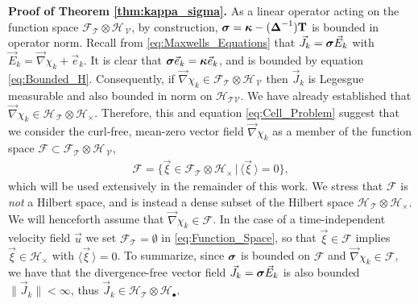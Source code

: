 \documentclass[11pt]{amsart}
\newcommand{\Tb}{\mathbf{T}}
\newcommand{\Tc}{\mathcal{T}}
\newcommand{\Vc}{\mathcal{V}}
\newcommand{\Hs}{\mathscr{H}}
\newcommand{\Fs}{\mathscr{F}}
\newcommand\bsig{\mbox{\boldmath${\sigma}$}}
\newcommand\bDelta{\mbox{\boldmath${\Delta}$}}
\newcommand\bkappa{\mbox{\boldmath${\kappa}$}}
\begin{document}
\textbf{Proof of Theorem \ref{thm:kappa_sigma}.}\hspace{1ex}
%
As a linear operator acting on the function space
$\Fs_{\Tc}\otimes\Hs_{\,\Vc}$, by construction,
$\bsig=\bkappa-(\bDelta^{-1})\Tb$ is bounded in operator norm. Recall
from \eqref{eq:Maxwells_Equations} that $\vec{J}_k=\bsig\vec{E}_k$
with $\vec{E}_k=\vec{\nabla}\chi_k+\vec{e}_k$. It is clear that
$\bsig\vec{e}_k=\bkappa\vec{e}_k$, and is bounded by equation
\eqref{eq:Bounded_H}. Consequently, if
$\vec{\nabla}\chi_k\in\Fs_{\Tc}\otimes\Hs_{\,\Vc}$ then  
$\vec{J}_k$ is Legesgue measurable and also bounded in norm on 
$\Hs_{\Tc\Vc}$. We have already established that 
$\vec{\nabla}\chi_k\in\Hs_{\,\Tc}\otimes\Hs_\times$. Therefore, this and equation
\eqref{eq:Cell_Problem} suggest that we consider the curl-free,
mean-zero vector field $\vec{\nabla}\chi_k$ as a member of the function space
$\Fs\subset\Fs_{\Tc}\otimes\Hs_{\,\Vc}$,         
%
\begin{align}\label{eq:Function_Space}
  \Fs=\{\vec{\xi}\in\Fs_{\Tc}\otimes\Hs_\times \,|\, \langle\vec{\xi}\,\rangle=0\},  
\end{align}
%
which will be used extensively in the remainder of this work. We
stress that $\Fs$ is \emph{not} a Hilbert space, and is instead a
dense subset of the Hilbert space $\Hs_{\,\Tc}\otimes\Hs_\times$. We will
henceforth assume that $\vec{\nabla}\chi_k\in\Fs$. In the case of a
time-independent velocity field $\vec{u}$ we set $\Fs_{\Tc}=\emptyset$ in 
\eqref{eq:Function_Space}, so that $\vec{\xi}\in\Fs$ implies 
$\vec{\xi}\in\Hs_\times$ with $\langle\vec{\xi}\,\rangle=0$. To summarize, since $\bsig$ is
bounded on $\Fs$ and $\vec{\nabla}\chi_k\in\Fs$, we have that the
divergence-free vector field $\vec{J}_k=\bsig\vec{E}_k$ is also
bounded $\|\vec{J}_k\|<\infty$, thus $\vec{J}_k\in\Hs_{\Tc}\otimes\Hs_\bullet$.  
\end{document}
